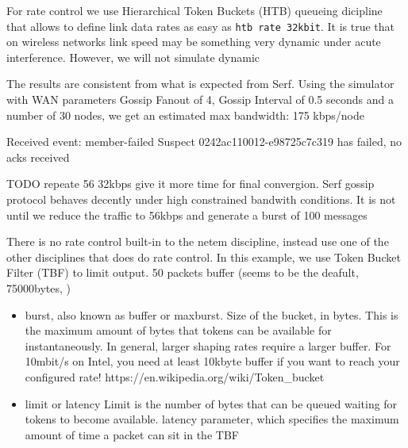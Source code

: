 \documentclass{sig-alternate}
\begin{document}
For rate control we use Hierarchical Token Buckets (HTB) queueing dicipline that allows to define link data rates as easy as \texttt{htb rate 32kbit}. It is true that on wireless networks link speed may be something very dynamic under acute interference. However, we will not simulate dynamic

The results are consistent from what is expected from Serf. Using the simulator with WAN parameters Gossip Fanout of 4, Gossip Interval of 0.5 seconds and a number of 30 nodes, we get an estimated max bandwidth: 175 kbps/node

Received event: member-failed Suspect 0242ac110012-e98725c7c319 has failed, no acks received

TODO repeate 56 32kbps give it more time for final convergion. Serf gossip protocol behaves decently under high constrained bandwith conditions. It is not until we reduce the traffic to 56kbps and generate a burst of 100 messages

There is no rate control built-in to the netem discipline, instead use one of the other disciplines that does do rate control. In this example, we use Token Bucket Filter (TBF) to limit output. 50 packets buffer (seems to be the deafult, 75000bytes, )

\begin{itemize}
 \item burst, also known as buffer or maxburst. Size of the bucket, in bytes. This is the maximum amount of bytes that tokens can be available for instantaneously. In general, larger shaping rates require a larger buffer. For 10mbit/s on Intel, you need at least 10kbyte buffer if you want to reach your configured rate! https://en.wikipedia.org/wiki/Token\_bucket
 \item limit or latency Limit is the number of bytes that can be queued waiting for tokens to become available. latency parameter, which specifies the maximum amount of time a packet can sit in the TBF 
\end{itemize}
\end{document}
